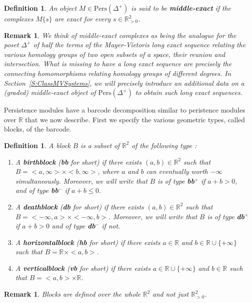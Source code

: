 \documentclass[a4paper, english, 11pt]{article}
\newcommand{\0}{\vec{0}}
\newcommand{\R}[0]{\mathbb{R}}
\newcommand{\Pers}[0]{\text{Pers}}
\newtheorem{remark}[prop]{Remark}
\newtheorem{defi}[prop]{Definition}
\begin{document}
\begin{defi}\label{D:middleexact} An object
$M\in \Pers(\Delta^+)$ is said to be \textbf{middle-exact} if the complexes $M\{s\}$ are exact for every $s\in\R^2_{>0} $.
\end{defi}
\begin{remark}
We think of middle-exact complexes as being the analogue for the poset $\Delta^+$ of half the terms of the Mayer-Vietoris long exact sequence relating the various homology groups of two open subsets of a space, their reunion and intersection. What is missing to have a long exact sequence are precisely the connecting homomorphisms relating homology groups of different degrees. In Section~\ref{S:ClassMVSystems}, we will precisely introduce an additional data on a (graded) middle-exact object of $\Pers(\Delta^+)$ to obtain such long exact sequences. 
\end{remark}
Persistence modules have a barcode decomposition similar to peristence modules over $\R$ that we now describe. First we specify the various geometric types, called blocks, of the barcode. 
\begin{defi}\label{def:block_MV}
A block $B$ is a subset of $\R^2$ of the following type : 
\begin{enumerate}
    \item A \textbf{birthblock} (\textbf{bb} for short) if there exists $(a,b)\in \R^2$ such that $B = <a,\infty> \times <b,\infty>$, where $a$ and $b$ can eventually worth $-\infty$ simultaneously. Moreover, we will write that $B$ is of type \textbf{bb$^+$} if $a+b > 0$, and of type \textbf{bb$^-$} if $a+b \leq 0$. 
    \item A \textbf{deathblock} (\textbf{db} for short) if there exists $(a,b)\in \R^2$ such that $B = <-\infty,a> \times <-\infty,b>$. 
    Moreover, we will write that $B$ is of type \textbf{db}$^+$ if  $a+b>0$ and of type \textbf{db$^-$} if not. 
     \item A \textbf{horizontalblock} (\textbf{hb} for short) if there exists $a\in \R$ and $b\in \R\cup \{+\infty\}$ such that $B = \R \times <a,b>$.
     \item A \textbf{verticalblock} (\textbf{vb} for short) if there exists $a\in \R\cup \{+\infty\}$ and $b\in \R$ such that $B = <a,b> \times \R$.
\end{enumerate}
\end{defi}
\begin{remark}
Blocks are defined over the whole $\R^2$ and not just $\R^2_{>0}$.
\end{remark}
\end{document}
